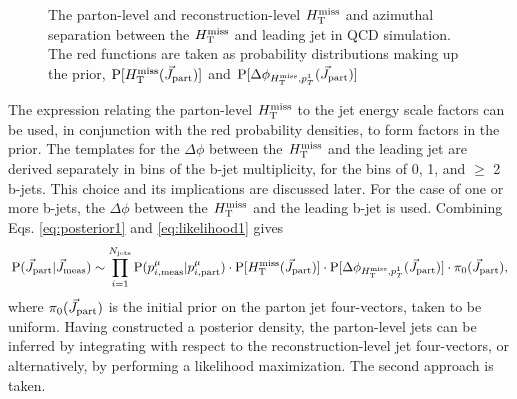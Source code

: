 \begin{figure}[h]
\centering
{}
\caption{The parton-level and reconstruction-level $H_{\text{T}}^{\rm miss}$ and azimuthal separation between the $H_{\text{T}}^{\rm miss}$ and leading jet in QCD simulation. The red functions are taken as probability distributions making up the prior, $\text{P}[H_{\text{T}}^{\rm miss}(\vec{J}_{\rm part})]$ and $\text{P}[\Delta\phi_{H_{\text{T}}^{\rm miss},p_{T}^1}(\vec{J}_{\rm part})]$}
\label{fig:Mht}
\end{figure}

The expression relating the parton-level $H_{\text{T}}^{\rm miss}$ to the jet energy scale factors can be used, in conjunction with the red probability densities, to form factors in the prior. The templates for the $\Delta\phi$ between the $H_{\text{T}}^{\rm miss}$ and the leading jet are derived separately in bins of the b-jet multiplicity, for the bins of 0, 1, and $\geq$ 2 b-jets.  This choice and its implications are discussed later. For the case of one or more b-jets, the $\Delta\phi$ between the $H_{\text{T}}^{\rm miss}$ and the leading b-jet is used. Combining Eqs. \ref{eq:posterior1} and \ref{eq:likelihood1} gives
\begin{equation}
{\rm P}(\vec{J}_{\rm part}|\vec{J}_{\rm meas}) \sim
\prod_{i=1}^{N_{\rm jets}}{\rm P}(p^{\mu}_{i,\rm meas}|p^{\mu}_{i,\rm part})\cdot \text{P}[H_{\text{T}}^{\rm miss}(\vec{J}_{\rm part})]\cdot \text{P}[\Delta\phi_{H_{\text{T}}^{\rm miss},p_{T}^1}(\vec{J}_{\rm part})]\cdot \pi_0(\vec{J}_{\rm part}),
\end{equation}
where $\pi_0(\vec{J}_{\rm part})$ is the initial prior on the parton jet four-vectors, taken to be uniform. Having constructed a posterior density, the parton-level jets can be inferred by integrating with respect to the reconstruction-level jet four-vectors, or alternatively, by performing a likelihood maximization. The second approach is taken.


